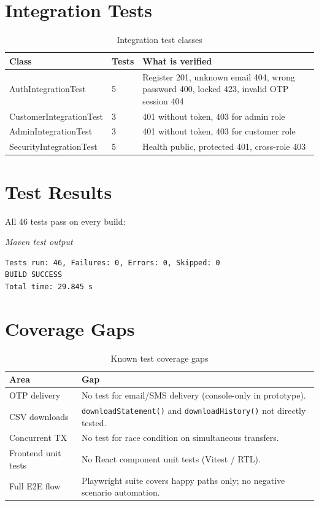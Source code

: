 \documentclass[12pt,a4paper]{report}
\begin{document}
\section{Integration Tests}

\begin{table}[H]
  \centering
  \caption{Integration test classes}
  \begin{tabular}{lll}
    \toprule
    \textbf{Class} & \textbf{Tests} & \textbf{What is verified} \\
    \midrule
    AuthIntegrationTest     & 5 & Register 201, unknown email 404,
                                  wrong password 400, locked 423,
                                  invalid OTP session 404 \\
    CustomerIntegrationTest & 3 & 401 without token, 403 for admin role \\
    AdminIntegrationTest    & 3 & 401 without token, 403 for customer role \\
    SecurityIntegrationTest & 5 & Health public, protected 401, cross-role 403 \\
    \bottomrule
  \end{tabular}
\end{table}

\section{Test Results}

All 46 tests pass on every build:


\textit{\small Maven test output}\vspace{2pt}
\begin{Verbatim}[frame=single,fontsize=\small,bgcolor=codegray]
Tests run: 46, Failures: 0, Errors: 0, Skipped: 0
BUILD SUCCESS
Total time: 29.845 s
\end{Verbatim}


\section{Coverage Gaps}

\begin{table}[H]
  \centering
  \caption{Known test coverage gaps}
  \begin{tabular}{lp{9cm}}
    \toprule
    \textbf{Area} & \textbf{Gap} \\
    \midrule
    OTP delivery        & No test for email/SMS delivery (console-only in prototype). \\
    CSV downloads       & \texttt{downloadStatement()} and \texttt{downloadHistory()}
                          not directly tested. \\
    Concurrent TX       & No test for race condition on simultaneous transfers. \\
    Frontend unit tests & No React component unit tests (Vitest / RTL). \\
    Full E2E flow       & Playwright suite covers happy paths only; no negative
                          scenario automation. \\
    \bottomrule
  \end{tabular}
\end{table}
\end{document}
